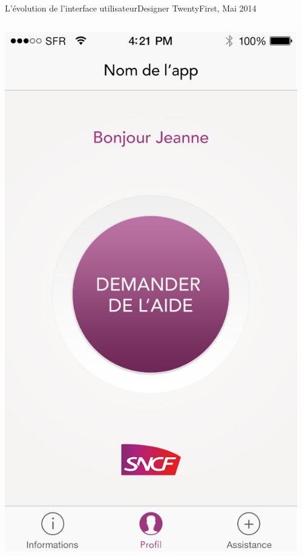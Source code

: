 \documentclass{beamer}
\begin{document}
\begin{frame}{L'évolution de l'interface utilisateur}{Designer TwentyFirst, Mai 2014}
    \begin{columns}
        \begin{column}{0.45\textwidth}
            \includegraphics[width=\textwidth]{thibault-04/01-home.jpg}
        \end{column}
        \begin{column}{0.45\textwidth}

\end{column}
\end{columns}
\end{frame}
\end{document}
